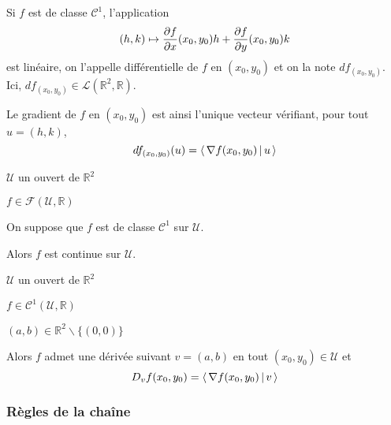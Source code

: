     Si $f$ est de classe $\mathcal{C}^1$, l’application 
    \[ (h,k) \mapsto \frac{\partial f}{\partial x}(x_0,y_0) h + \frac{\partial f}{\partial y}(x_0,y_0)k \]   est linéaire, on l’appelle différentielle de $f$ en $(x_0, y_0)$ et on la note $df_{(x_0,y_0)}$. Ici, $df_{(x_0,y_0)} \in \mathcal{L}(\mathbb{R}^2, \mathbb{R})$. 

    Le gradient de $f$ en $(x_0, y_0)$ est ainsi l’unique vecteur vérifiant, pour tout $u = (h,k)$, 
    \[ df_{(x_0,y_0)}(u) = \left<\,\nabla f(x_0,y_0)\,\middle|\,u\,\right> \]   

    \begin{coro}{}{}
        \begin{soient}
            \item $\mathcal{U}$ un ouvert de $\mathbb{R}^2$
            \item $f\in \mathcal{F}(\mathcal{U},\mathbb{R})$
        \end{soient}
        On suppose que $f$ est de classe $\mathcal{C}^1$ sur $\mathcal{U}$.

        Alors $f$ est continue sur $\mathcal{U}$.
    \end{coro}

    \begin{coro}{}{}
        \begin{soient}
            \item $\mathcal{U}$ un ouvert de $\mathbb{R}^2$
            \item $f\in \mathcal{C}^1(\mathcal{U},\mathbb{R})$
            \item $(a,b) \in \mathbb{R}^2 \backslash \{ (0,0) \}$
        \end{soient}

        Alors $f$ admet une dérivée suivant $v = (a,b)$ en tout $(x_0,y_0) \in \mathcal{U}$ et 
        \[ D_v f(x_0,y_0) = \left<\,\nabla f(x_0,y_0)\,\middle|\,v\,\right> \]
    \end{coro}

    \subsubsection{Règles de la chaîne}


